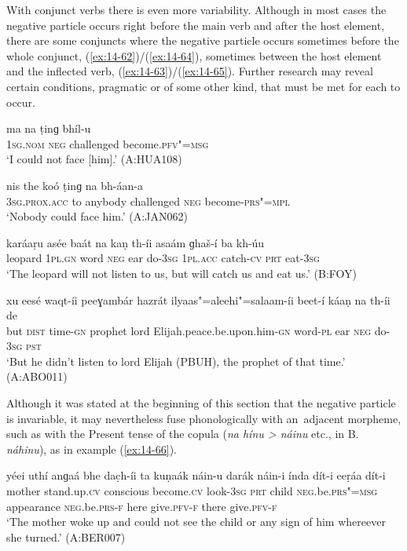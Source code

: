 With conjunct verbs there is even more variability. Although in most cases the negative particle occurs right before the main verb and after the host element, there are some conjuncts where the negative particle occurs sometimes before the whole conjunct, (\ref{ex:14-62})/(\ref{ex:14-64}), sometimes between the host element and the inflected verb, (\ref{ex:14-63})/(\ref{ex:14-65}). Further research may reveal certain conditions, pragmatic or of some other kind, that must be met for each to occur. 

\begin{exe}
\ex
\label{ex:14-62}
\gll ma na ṭinɡ bhíl-u \\
\textsc{1sg.nom} \textsc{neg} challenged become.\textsc{pfv"=msg } \\
\glt `I could not face [him].' (A:HUA108)

\ex
\label{ex:14-63}
\gll nis the koó ṭinɡ na  bh-áan-a \\
\textsc{3sg.prox.acc} to anybody challenged \textsc{neg} become-\textsc{prs"=mpl } \\
\glt `Nobody could face him.' (A:JAN062)

\ex
\label{ex:14-64}
\gll karáaṛu asée baát na kaṇ th-íi asaám ɡhaš-í  ba kh-úu \\
leopard \textsc{1pl.gn} word \textsc{neg} ear do-\textsc{3sg} \textsc{1pl.acc} catch-\textsc{cv}  \textsc{prt} eat-\textsc{3sg} \\
\glt `The leopard will not listen to us, but will catch us and eat us.' (B:FOY)

\ex
\label{ex:14-65}
\gll xu eesé waqt-íi peeɣambár hazrát ilyaas"=aleehi"=salaam-íi  beet-í
káaṇ na th-íi  de \\
but \textsc{dist} time-\textsc{gn} prophet lord  Elijah.peace.be.upon.him-\textsc{gn } word-\textsc{pl} ear \textsc{neg} do-\textsc{3sg} \textsc{pst} \\
\glt `But he didn't listen to lord Elijah (PBUH), the prophet of that time.' (A:ABO011)
\end{exe}

Although it was stated at the beginning of this section that the negative particle is invariable, it may nevertheless fuse phonologically with an~adjacent morpheme, such as with the Present tense of the copula (\textit{na hínu {\textgreater} náinu} etc., in B. \textit{náhinu}), as in example (\ref{ex:14-66}).

\begin{exe}
\ex
\label{ex:14-66}
\gll yéei uthí anɡaá bhe dac̣h-íi  ta kuṇaák náin-u darák náin-i  índa dít-i eeṛáa dít-i \\
mother stand.up.\textsc{cv} conscious become.\textsc{cv} look-\textsc{3sg}  \textsc{prt} child \textsc{neg.}be.\textsc{prs"=msg} appearance \textsc{neg.}be.\textsc{prs-f}  here give.\textsc{pfv-f} there give.\textsc{pfv-f} \\
\glt `The mother woke up and could not see the child or any sign of him whereever she turned.' (A:BER007)
\end{exe}

